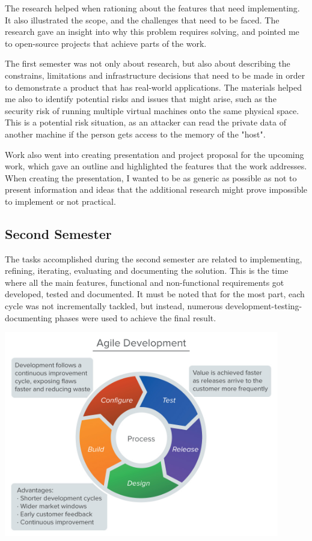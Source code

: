 \documentclass{article}
\begin{document}
The research helped when rationing about the features that need implementing. It also illustrated the scope, and the challenges that need to be faced. The research gave an insight into why this problem requires solving, and pointed me to open-source projects that achieve parts of the work.

The first semester was not only about research, but also about describing the constrains, limitations and infrastructure decisions that need to be made in order to demonstrate a  product that has real-world applications.
The materials helped me also to identify potential risks and issues that might arise, such as the security risk of running multiple virtual machines onto the same physical space. This is a potential risk situation, as an attacker can read the private data of another machine if the person gets access to the memory of the "host".

Work also went into creating presentation and project proposal for the upcoming work, which gave an outline and highlighted the features that the work addresses.
When creating the presentation, I wanted to be as generic as possible as not to present information and ideas that the additional research might prove impossible to implement or not practical.

\subsection{Second Semester}

The tasks accomplished during the second semester are related to implementing, refining, iterating, evaluating and documenting the solution. This is the time where all the main features, functional and non-functional requirements got developed, tested and documented. It must be noted that for the most part, each cycle was not incrementally tackled, but instead, numerous development-testing-documenting phases were used to achieve the final result.
\begin{center}
	\includegraphics[width=12cm]{agile.jpg}
\end{center}
\end{document}
